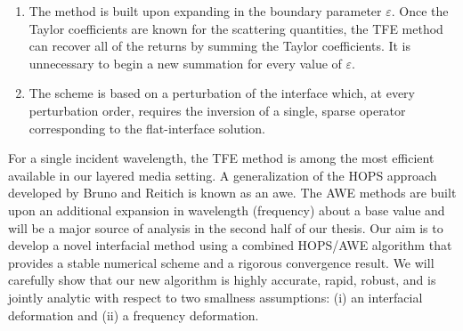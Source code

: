 \begin{enumerate}
    \item The method is built upon expanding in the boundary parameter $\varepsilon$. Once the Taylor coefficients are known for the scattering quantities, the TFE method can recover all of the returns by summing the Taylor coefficients. It is unnecessary to begin a new summation for every value of $\varepsilon$. 
    \item The scheme is based on a perturbation of the interface which, at every perturbation order, requires the inversion of a single, sparse operator corresponding to the flat-interface solution.
\end{enumerate}
For a single incident wavelength, the TFE method is among the most efficient available in our layered media setting. A generalization of the HOPS approach developed by Bruno and Reitich is known as an \gls{awe}. The AWE methods \cite{PillageRohrer90,KSNZA96,ReddyDeshpandeCockrellBeck98,SloaneLeeLee01,Nicholls16} are built upon an additional expansion in wavelength (frequency) about a base value and will be a major source of analysis in the second half of our thesis. Our aim is to develop a novel interfacial method using a combined HOPS/AWE algorithm that provides a stable numerical scheme and a rigorous convergence result. We will carefully show that our new algorithm is highly accurate, rapid, robust, and is jointly analytic with respect to two smallness assumptions: (i) an interfacial deformation and (ii) a frequency deformation.